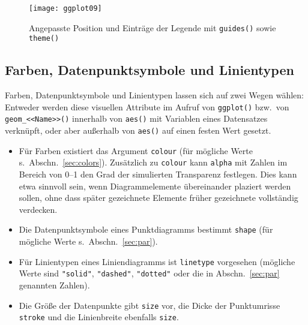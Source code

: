 \begin{figure}[ht]
\centering
\texttt{[image: ggplot09]}
\vspace*{-0.5em}
\caption{Angepasste Position und Einträge der Legende mit \lstinline!guides()! sowie \lstinline!theme()!}
\label{fig:ggplot09}
\end{figure}

\subsection{Farben, Datenpunktsymbole und Linientypen}
\label{sec:ggplotColour}

Farben, Datenpunktsymbole und Linientypen lassen sich auf zwei Wegen wählen: Entweder werden diese visuellen Attribute im Aufruf von \lstinline!ggplot()! bzw.\ von \lstinline!geom_<<Name>>()! innerhalb von \lstinline!aes()! mit Variablen eines Datensatzes verknüpft, oder aber außerhalb von \lstinline!aes()! auf einen festen Wert gesetzt.
\begin{itemize}
\item Für Farben existiert das Argument \lstinline!colour! (für mögliche Werte s.\ Abschn.\ \ref{sec:colors}). Zusätzlich zu \lstinline!colour! kann \lstinline!alpha! mit Zahlen im Bereich von 0--1 den Grad der simulierten Transparenz festlegen. Dies kann etwa sinnvoll sein, wenn Diagrammelemente übereinander plaziert werden sollen, ohne dass später gezeichnete Elemente früher gezeichnete vollständig verdecken.
\item Die Datenpunktsymbole eines Punktdiagramms bestimmt \lstinline!shape! (für mögliche Werte s.\ Abschn.\ \ref{sec:par}).
\item Für Linientypen eines Liniendiagramms ist \lstinline!linetype! vorgesehen (mögliche Werte sind \lstinline!"solid"!, \lstinline!"dashed"!, \lstinline!"dotted"! oder die in Abschn.\ \ref{sec:par} genannten Zahlen).
\item Die Größe der Datenpunkte gibt \lstinline!size! vor, die Dicke der Punktumrisse \lstinline!stroke! und die Linienbreite ebenfalls \lstinline!size!. 
\end{itemize}

